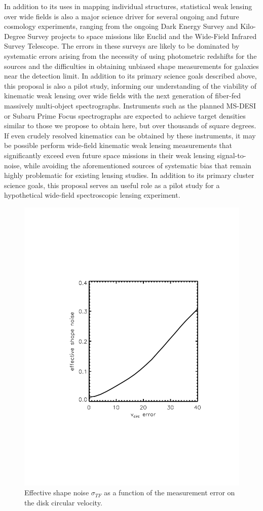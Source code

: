 \documentclass[12pt]{article}
\begin{document}
In addition to its uses in mapping individual structures, statistical weak lensing over wide fields is also a major science driver for several ongoing and future cosmology experiments, ranging from the ongoing Dark Energy Survey and Kilo-Degree Survey projects to space missions like Euclid and the Wide-Field Infrared Survey Telescope. The errors in these surveys are likely to be dominated by systematic errors arising from the necessity of using photometric redshifts for the sources and the difficulties in obtaining unbiased shape measurements for galaxies near the detection limit. In addition to its primary science goals described above, this proposal is also a pilot study, informing our understanding of the viability of kinematic weak lensing over wide fields with the next generation of fiber-fed massively multi-object spectrographs. Instruments such as the planned MS-DESI or Subaru Prime Focus spectrographs are expected to achieve target densities similar to those we propose to obtain here, but over thousands of square degrees. If even crudely resolved kinematics can be obtained by these instruments, it may be possible perform wide-field kinematic weak lensing measurements that significantly exceed even future space missions in their weak lensing signal-to-noise, while avoiding the aforementioned sources of systematic bias that remain highly problematic for existing lensing studies. In addition to its primary cluster science goals, this proposal serves an useful role as a pilot study for a hypothetical wide-field spectroscopic lensing experiment.

\begin{figure}[t]
\begin{center}
\includegraphics[width=0.45\linewidth, bb= 150 150 550 650,clip]{Plots/vcirc_error.pdf}
\caption{\footnotesize Effective shape noise $\sigma_{TF}$ as a  function of the
  measurement error on the disk circular velocity.}
\label{fig:shapeNoise}
\end{center}
\end{figure}
\end{document}
